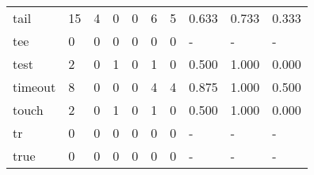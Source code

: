 \begin{longtable}{lp{2.0cm}p{2.0cm}p{2.0cm}p{2.0cm}p{2.0cm}p{2.0cm}p{2.0cm}p{2.0cm}p{2.0cm}}
tail      &                     15 &                                  4 &                                 0 &                                0 &                                 6 &                               5 &                                0.633 &                                  0.733 &                                0.333 \\
tee       &                      0 &                                  0 &                                 0 &                                0 &                                 0 &                               0 &                                    - &                                      - &                                    - \\
test      &                      2 &                                  0 &                                 1 &                                0 &                                 1 &                               0 &                                0.500 &                                  1.000 &                                0.000 \\
timeout   &                      8 &                                  0 &                                 0 &                                0 &                                 4 &                               4 &                                0.875 &                                  1.000 &                                0.500 \\
touch     &                      2 &                                  0 &                                 1 &                                0 &                                 1 &                               0 &                                0.500 &                                  1.000 &                                0.000 \\
tr        &                      0 &                                  0 &                                 0 &                                0 &                                 0 &                               0 &                                    - &                                      - &                                    - \\
true      &                      0 &                                  0 &                                 0 &                                0 &                                 0 &                               0 &                                    - &                                      - &                                    - \\

\end{longtable}
